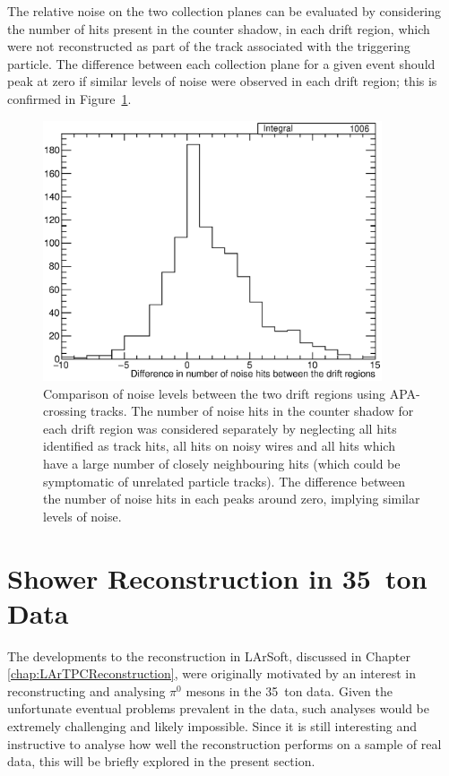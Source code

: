 The relative noise on the two collection planes can be evaluated by considering the number of hits present in the counter shadow, in each drift region, which were not reconstructed as part of the track associated with the triggering particle.  The difference between each collection plane for a given event should peak at zero if similar levels of noise were observed in each drift region; this is confirmed in Figure~\ref{fig:CollectionPlaneNoise}.

\begin{figure}
  \centering
  \includegraphics[width=10cm]{CollectionPlaneNoise.eps}
  \caption[Comparison of noise levels between the two drift regions using APA-crossing tracks.]{Comparison of noise levels between the two drift regions using APA-crossing tracks.  The number of noise hits in the counter shadow for each drift region was considered separately by neglecting all hits identified as track hits, all hits on noisy wires and all hits which have a large number of closely neighbouring hits (which could be symptomatic of unrelated particle tracks).  The difference between the number of noise hits in each peaks around zero, implying similar levels of noise.}
  \label{fig:CollectionPlaneNoise}
\end{figure}

\section{Shower Reconstruction in 35~ton Data}\label{sec:ShowerData}

The developments to the reconstruction in LArSoft, discussed in Chapter \ref{chap:LArTPCReconstruction}, were originally motivated by an interest in reconstructing and analysing $\pi^0$ mesons in the 35~ton data.  Given the unfortunate eventual problems prevalent in the data, such analyses would be extremely challenging and likely impossible.  Since it is still interesting and instructive to analyse how well the reconstruction performs on a sample of real data, this will be briefly explored in the present section.

